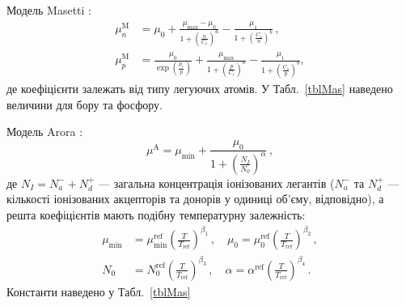 \documentclass[fleqn,twoside,twocolumn,nofootinbib,showkeys]{revtex4} %
\begin{document}
Модель Masetti \cite{Masetti1983}:
\begin{equation}\label{eqMas}
\begin{aligned}
    \mu_n^\mathrm{M} &=\mu_0+\frac{\mu_\mathrm{max}-\mu_0}{1+\left(\frac{n}{C_r}\right)^a}-\frac{\mu_1}{1+\left(\frac{C_s}{n}\right)^b}\,, \\
   \mu_p^\mathrm{M}&=\frac{\mu_0}{\exp\left(\frac{p_c}{p}\right)}\!+\!\frac{\mu_\mathrm{max}}{1+\left(\frac{p}{C_r}\right)^a}\!-\!\frac{\mu_1}{1+\left(\frac{C_s}{p}\right)^b},
\end{aligned}
\end{equation}
де коефіцієнти залежать від типу легуючих атомів.
У Табл.~\ref{tblMas} наведено величини для бору та фосфору.
\begin{table}
\caption{Коефіцієнти для розрахунку рухливості відповідно до моделі Masetti (\ref{eqMas})}
\label{tblMas}
\vspace{2mm}
\centering
{}
\end{table}

Модель Arora \cite{Arora1982}:
\begin{equation}\label{eqArora}
  \mu^\mathrm{A}=\mu_\mathrm{min}+\frac{\mu_0}{1+\left(\frac{N_I}{N_0}\right)^\alpha}\,,
\end{equation}
де $N_I=N_a^-+N_d^+$ --- загальна концентрація іонізованих легантів
($N_a^-$ та $N_d^+$ --- кількості іонізованих акцепторів та донорів у одиниці об'єму, відповідно),
а решта коефіцієнтів мають подібну температурну залежність:
\begin{equation}\label{eqArora2}
\begin{aligned}
    \mu_\mathrm{min} &=\mu_\mathrm{min}^\mathrm{ref}\left(\frac{T}{T_\mathrm{ref}}\right)^{\beta_1}\,, \quad
   \mu_0 =\mu_0^\mathrm{ref}\left(\frac{T}{T_\mathrm{ref}}\right)^{\beta_2}\,,\\
   N_0 &=N_0^\mathrm{ref}\left(\frac{T}{T_\mathrm{ref}}\right)^{\beta_3}\,,\quad
   \alpha =\alpha^\mathrm{ref}\left(\frac{T}{T_\mathrm{ref}}\right)^{\beta_4}\,.\
\end{aligned}
\end{equation}
Константи наведено у Табл.~\ref{tblMas}
\end{document}
